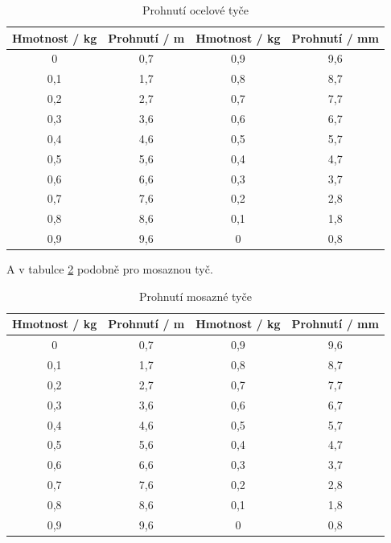 \begin{table}[h]
\centering
\begin{tabular}{|c|c|c|c|}
\hline
Hmotnost / kg & Prohnutí / m & Hmotnost / kg & Prohnutí / mm \\ \hline
0             & 0,7          & 0,9           & 9,6          \\ \hline
0,1           & 1,7          & 0,8           & 8,7          \\ \hline
0,2           & 2,7          & 0,7           & 7,7          \\ \hline
0,3           & 3,6          & 0,6           & 6,7          \\ \hline
0,4           & 4,6          & 0,5           & 5,7          \\ \hline
0,5           & 5,6          & 0,4           & 4,7          \\ \hline
0,6           & 6,6          & 0,3           & 3,7          \\ \hline
0,7           & 7,6          & 0,2           & 2,8          \\ \hline
0,8           & 8,6          & 0,1           & 1,8          \\ \hline
0,9           & 9,6          & 0             & 0,8          \\ \hline
\end{tabular}
\caption{Prohnutí ocelové tyče}
\label{tab:ocelova-tyc}
\end{table}

A v tabulce \ref{tab:mosazna-tyc} podobně pro mosaznou tyč.

\begin{table}[h]
\centering
\begin{tabular}{|c|c|c|c|}
\hline
Hmotnost / kg & Prohnutí / m & Hmotnost / kg & Prohnutí / mm \\ \hline
0             & 0,7          & 0,9           & 9,6          \\ \hline
0,1           & 1,7          & 0,8           & 8,7          \\ \hline
0,2           & 2,7          & 0,7           & 7,7          \\ \hline
0,3           & 3,6          & 0,6           & 6,7          \\ \hline
0,4           & 4,6          & 0,5           & 5,7          \\ \hline
0,5           & 5,6          & 0,4           & 4,7          \\ \hline
0,6           & 6,6          & 0,3           & 3,7          \\ \hline
0,7           & 7,6          & 0,2           & 2,8          \\ \hline
0,8           & 8,6          & 0,1           & 1,8          \\ \hline
0,9           & 9,6          & 0             & 0,8          \\ \hline
\end{tabular}
\caption{Prohnutí mosazné tyče}
\label{tab:mosazna-tyc}
\end{table}

